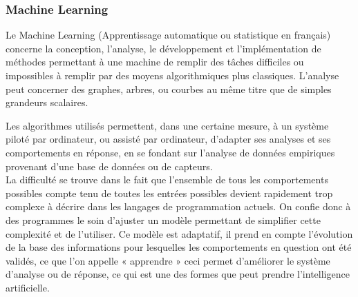 \documentclass[12pt]{article}
\begin{document}
\subsubsection{Machine Learning}
Le Machine Learning (Apprentissage automatique ou statistique en français) concerne la conception, l'analyse, le développement et l'implémentation de méthodes permettant à une machine de remplir des tâches difficiles ou impossibles à remplir par des moyens algorithmiques plus classiques. L'analyse peut concerner des graphes, arbres, ou courbes au même titre que de simples grandeurs scalaires.
\par
Les algorithmes utilisés permettent, dans une certaine mesure, à un système piloté par ordinateur, ou assisté par ordinateur, d'adapter ses analyses et ses comportements en réponse, en se fondant sur l'analyse de données empiriques provenant d'une base de données ou de capteurs.\\
La difficulté se trouve dans le fait que l'ensemble de tous les comportements possibles compte tenu de toutes les entrées possibles devient rapidement trop complexe à décrire dans les langages de programmation actuels. On confie donc à des programmes le soin d'ajuster un modèle permettant de simplifier cette complexité et de l'utiliser. Ce modèle est adaptatif, il prend en compte l'évolution de la base des informations pour lesquelles les comportements en question ont été validés, ce que l'on appelle « apprendre » ceci permet d'améliorer le système d'analyse ou de réponse, ce qui est une des formes que peut prendre l'intelligence artificielle.
\end{document}
